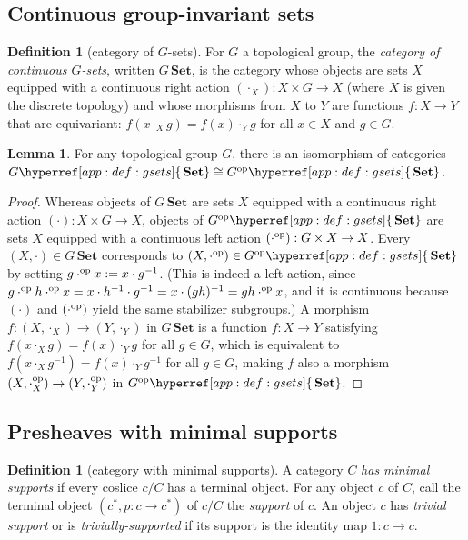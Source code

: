 \documentclass[
  sigconf,
  screen, ]{acmart}
\theoremstyle{definition}
\newtheorem{lemma}[theorem]{Lemma}
\newtheorem{definition}[theorem]{Definition}
\newcommand\nref[2]{\hyperref[#1]{#2}} \newcommand\checkhigh{{\huge{\color{red}\textbf{TODO: check}}}}
\newcommand\tgsets[1]{{#1{\nref{app:def:gsets}{\,\Set}}}}
\newcommand\op{^{\rm op}}
\newcommand\Set{\mathbf{Set}}
\begin{document}
\subsection{Continuous group-invariant sets} \label{app:sec:tgsets}

\begin{definition}[category of $G$-sets] \label{app:def:gsets}
  For $G$ a topological group,
  the \emph{category of continuous $G$-sets},
  written $\tgsets G$,
  is the category whose objects are sets $X$ equipped
  with a continuous right action $(\cdot_X) : X\times G\to X$
  (where $X$ is given the discrete topology)
  and whose morphisms from $X$ to $Y$
  are functions $f : X\to Y$
  that are equivariant: $f(x\cdot_X g) = f(x)\cdot_Y g$
  for all $x\in X$ and $g\in G$.
\end{definition}

\begin{lemma} \label{app:lem:left-right-gsets}
  For any topological group $G$, there is an
  isomorphism of categories
  $\tgsets G\cong \tgsets{G\op}$.
\end{lemma}
\begin{proof}
  Whereas objects of $\tgsets G$
  are sets $X$ equipped with a continuous right action
  $(\cdot) : X\times G\to X$,
  objects of $\tgsets{G\op}$
  are sets $X$ equipped with a continuous left action
  $(\cdot\op) : G\times X\to X$.
  Every $(X,\cdot)\in\tgsets G$
  corresponds to $(X, \cdot\op)\in\tgsets{G\op}$
  by setting $g \cdot\op x := x\cdot g^{-1}$.
  (This is indeed a left action, since
  $g\cdot\op h \cdot\op x = x\cdot h^{-1}\cdot g^{-1}
  = x\cdot (gh)^{-1} = gh\cdot\op x$,
  and it is continuous because
  $(\cdot)$ and $(\cdot\op)$
  yield the same stabilizer subgroups.)
  A morphism $f : (X,\cdot_X)\to(Y,\cdot_Y)$ in $\tgsets G$
  is a function $f : X\to Y$
  satisfying $f(x\cdot_X g) = f(x)\cdot_Y g$ for all $g\in G$,
  which is equivalent to $f(x\cdot_X g^{-1}) = f(x)\cdot_Y g^{-1}$
  for all $g\in G$,
  making $f$ also a morphism $(X,\cdot\op_X)\to(Y,\cdot\op_Y)$
  in $\tgsets{G\op}$.
\end{proof}

\subsection{Presheaves with minimal supports}

\begin{definition}[category with minimal supports] \label{app:def:supported-category}
  A category $C$ \emph{has minimal supports} if every coslice
  $c/C$ has a terminal object.
  For any object $c$ of $C$, call the terminal object
  $(c^*, p : c\to c^*)$ of $c/C$ the \emph{support} of $c$.
  An object $c$ has \emph{trivial support}
  or is \emph{trivially-supported}
  if its support is the identity map $1 : c\to c$.
\end{definition}
\end{document}

